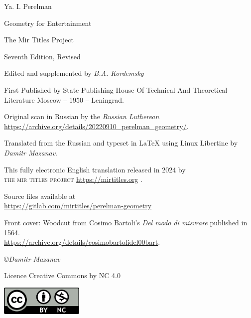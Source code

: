 

\maketitle
\cleardoublepage
\thispagestyle{empty}
\begin{center}

{\LARGE Ya. I. Perelman}

{\Huge Geometry for Entertainment}




The Mir Titles Project

\end{center}
\cleardoublepage

\thispagestyle{empty}
\vfill
\begin{small}

{\noindent
Seventh Edition, Revised

Edited and supplemented by \emph{B.A. Kordemsky}

First Published by State Publishing House Of Technical And Theoretical Literature Moscow -- 1950 -- Leningrad.

Original scan in Russian by the \emph{Russian Lutherean}\\ \url{https://archive.org/details/20220910_perelman_geometry/}.

Translated from the Russian and typeset in \LaTeX{} using Linux Libertine by \emph{Damitr Mazanav}.

This fully electronic English translation released in 2024 by \\\textsc{the mir titles project} \url{https://mirtitles.org} .

Source files available at \\ \url{https://gitlab.com/mirtitles/perelman-geometry}
 
Front cover: Woodcut from Cosimo Bartoli's \emph{Del modo di misvrare} published in 1564. \\ \url{https://archive.org/details/cosimobartolidel00bart}.

\copyright \emph{Damitr Mazanav}

Licence Creative Commons by NC 4.0}

\includegraphics[width=0.3\textwidth]{figures/cc-by-nc.pdf}

\end{small}

